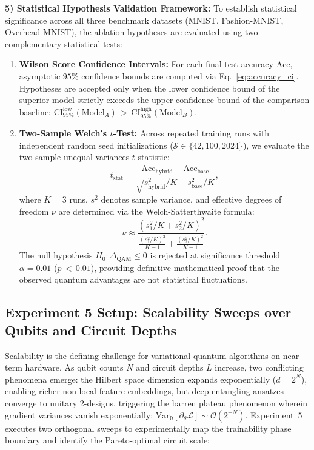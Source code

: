 \documentclass[pdflatex,sn-mathphys-num]{sn-jnl}%
\theoremstyle{thmstyleone}%
\theoremstyle{thmstyletwo}%
\theoremstyle{thmstylethree}%
\begin{document}
\textbf{5) Statistical Hypothesis Validation Framework:}
To establish statistical significance across all three benchmark datasets (MNIST, Fashion-MNIST, Overhead-MNIST), the ablation hypotheses are evaluated using two complementary statistical tests:
\begin{enumerate}
    \item \textbf{Wilson Score Confidence Intervals:} For each final test accuracy $\mathrm{Acc}$, asymptotic $95\%$ confidence bounds are computed via Eq.~\eqref{eq:accuracy_ci}. Hypotheses are accepted only when the lower confidence bound of the superior model strictly exceeds the upper confidence bound of the comparison baseline: $\mathrm{CI}_{95\%}^{\mathrm{low}}(\mathrm{Model}_A) \,{>}\, \mathrm{CI}_{95\%}^{\mathrm{high}}(\mathrm{Model}_B)$.
    \item \textbf{Two-Sample Welch's $t$-Test:} Across repeated training runs with independent random seed initializations ($\mathcal{S} \in \{42, 100, 2024\}$), we evaluate the two-sample unequal variances $t$-statistic:
    \begin{equation}
    t_{\mathrm{stat}} = \frac{\overline{\mathrm{Acc}}_{\mathrm{hybrid}} - \overline{\mathrm{Acc}}_{\mathrm{base}}}{\sqrt{s_{\mathrm{hybrid}}^2/K + s_{\mathrm{base}}^2/K}},
    \label{eq:welch_ttest_ablation}
    \end{equation}
    where $K = 3$ runs, $s^2$ denotes sample variance, and effective degrees of freedom $\nu$ are determined via the Welch-Satterthwaite formula:
    \begin{equation}
    \nu \approx \frac{\left( s_1^2/K + s_2^2/K \right)^2}{\frac{(s_1^2/K)^2}{K-1} + \frac{(s_2^2/K)^2}{K-1}}.
    \label{eq:welch_satterthwaite}
    \end{equation}
    The null hypothesis $H_0: \Delta_{\mathrm{QAM}} \le 0$ is rejected at significance threshold $\alpha = 0.01$ ($p \,{<}\, 0.01$), providing definitive mathematical proof that the observed quantum advantages are not statistical fluctuations.
\end{enumerate}

\subsection{Experiment 5 Setup: Scalability Sweeps over Qubits and Circuit Depths}
\label{subsec:exp5_setup}
Scalability is the defining challenge for variational quantum algorithms on near-term hardware. As qubit counts $N$ and circuit depths $L$ increase, two conflicting phenomena emerge: the Hilbert space dimension expands exponentially ($d = 2^N$), enabling richer non-local feature embeddings, but deep entangling ansatzes converge to unitary 2-designs, triggering the barren plateau phenomenon \cite{mcclean2018barren} wherein gradient variances vanish exponentially: $\mathrm{Var}_{\boldsymbol{\theta}}[\partial_\theta \mathcal{L}] \sim \mathcal{O}(2^{-N})$. Experiment~5 executes two orthogonal sweeps to experimentally map the trainability phase boundary and identify the Pareto-optimal circuit scale:
\end{document}
